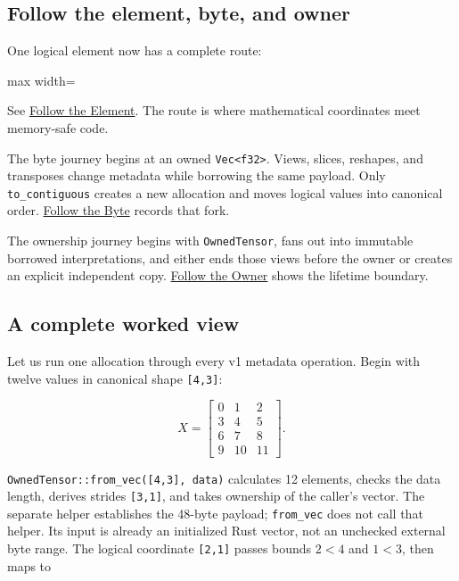 \documentclass[
  10pt,
]{article}
\begin{document}
\subsection{Follow the element, byte, and
owner}\label{follow-the-element-byte-and-owner}

One logical element now has a complete route:

\begin{center}\begin{adjustbox}{max width=\linewidth}\end{adjustbox}\end{center}

See
\href{https://github.com/hermonai/inside-the-llm-engine/blob/astra-visual-rewrite/diagrams/tensor/follow-the-element.txt}{Follow
the Element}. The route is where mathematical coordinates meet
memory-safe code.

The byte journey begins at an owned
\texttt{Vec\textless{}f32\textgreater{}}. Views, slices, reshapes, and
transposes change metadata while borrowing the same payload. Only
\texttt{to\_contiguous} creates a new allocation and moves logical
values into canonical order.
\href{https://github.com/hermonai/inside-the-llm-engine/blob/astra-visual-rewrite/diagrams/tensor/follow-the-byte.txt}{Follow
the Byte} records that fork.

The ownership journey begins with \texttt{OwnedTensor}, fans out into
immutable borrowed interpretations, and either ends those views before
the owner or creates an explicit independent copy.
\href{https://github.com/hermonai/inside-the-llm-engine/blob/astra-visual-rewrite/diagrams/tensor/follow-the-owner.txt}{Follow
the Owner} shows the lifetime boundary.

\subsection{A complete worked view}\label{a-complete-worked-view}

Let us run one allocation through every v1 metadata operation. Begin
with twelve values in canonical shape \texttt{{[}4,3{]}}:

\[
X=
\begin{bmatrix}
0&1&2\\
3&4&5\\
6&7&8\\
9&10&11
\end{bmatrix}.
\]

\texttt{OwnedTensor::from\_vec({[}4,3{]},\ data)} calculates 12
elements, checks the data length, derives strides \texttt{{[}3,1{]}},
and takes ownership of the caller's vector. The separate
\texttt{} helper establishes the 48-byte
payload; \texttt{from\_vec} does not call that helper. Its input is
already an initialized Rust vector, not an unchecked external byte
range. The logical coordinate \texttt{{[}2,1{]}} passes bounds \(2<4\)
and \(1<3\), then maps to
\end{document}
